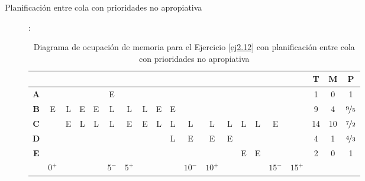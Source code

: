 \begin{ejercicio}
\begin{description}
        \item[Planificación entre cola con prioridades no apropiativa]:
        \begin{table}[H]
            \begin{tabular}{ccccccccccccccccc|ccc}
                 &  &  &  &  &    &  &  &  &  &    &   &  &  &  &   &    & \textbf{T} & \textbf{M} & \textbf{P} \\ \hline
            \multicolumn{1}{c|}{\textbf{A}} &  &  &  &  & E  &  &  &  &  &    &   &  &  &  &   &    & 1   & 0   & 1   \\ \hline
            \multicolumn{1}{c|}{\textbf{B}} & E       & {\color[HTML]{F56B00} L}       & E   & E   & {\color[HTML]{FE0000} L} & L       & L   & E   & E   &  & &    &    &    &  &    & 9  & 4  & $\nicefrac{9}{5}$   \\ \hline
            \multicolumn{1}{c|}{\textbf{C}} &  & E   & {\color[HTML]{F56B00} L}       & L   & L  & E       & E   & {\color[HTML]{FE0000} L}       & L   & L  & L & L   & L  & L & E  &    & 14  & 10   & $\nicefrac{7}{2}$       \\ \hline
            \multicolumn{1}{c|}{\textbf{D}} &  &  &  &  &    &  &  &  & L   & E & {\color[HTML]{F56B00} E} & E &  &  &   &  & 4   & 1   & $\nicefrac{4}{3}$ \\ \hline
            \multicolumn{1}{c|}{\textbf{E}} &  &  &  &  &    &  &  &  &  &    &   &  & E   & {\color[HTML]{F56B00} E}       &   &    & 2   & 0   & 1   \\ \hline
            \multicolumn{1}{c|}{}    & \multicolumn{1}{c|}{$0^+$} & \multicolumn{1}{c|}{\textit{}} & \multicolumn{1}{c|}{\textit{}} & \multicolumn{1}{c|}{\textit{}} & \multicolumn{1}{c|}{$5^-$} & \multicolumn{1}{c|}{$5^+$} & \multicolumn{1}{c|}{\textit{}} & \multicolumn{1}{c|}{\textit{}} & \multicolumn{1}{c|}{\textit{}} & \multicolumn{1}{c|}{$10^-$} & \multicolumn{1}{c|}{$10^+$} & \multicolumn{1}{c|}{\textit{}} & \multicolumn{1}{c|}{\textit{}} & \multicolumn{1}{c|}{\textit{}} & \multicolumn{1}{c|}{$15^-$} & $15^+$ &     &     &    
            \end{tabular}
            \caption{\centering Diagrama de ocupación de memoria para el Ejercicio \ref{ej2.12} con planificación entre cola con prioridades no apropiativa}
        \end{table}

    \end{description}
\end{ejercicio}